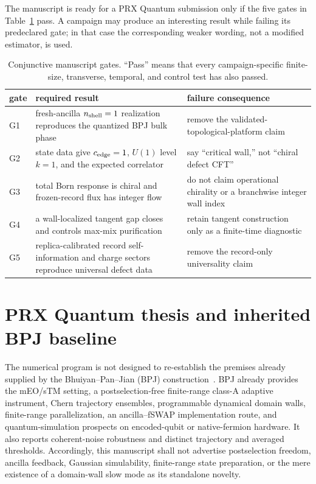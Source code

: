 \documentclass[aps,prx,onecolumn,nofootinbib,superscriptaddress,longbibliography]{revtex4-2}
\begin{document}
The manuscript is ready for a PRX Quantum submission only if the five gates in
Table~\ref{tab:gates} pass.  A campaign may produce an interesting result while failing its
predeclared gate; in that case the corresponding weaker wording, not a modified estimator,
is used.

\begin{table}[t]
\caption{Conjunctive manuscript gates.  ``Pass'' means that every campaign-specific
finite-size, transverse, temporal, and control test has also passed.}
\label{tab:gates}
\begin{ruledtabular}
\begin{tabular}{@{}p{}p{}p{}@{}}
gate & required result & failure consequence \\
\hline
G1 & fresh-ancilla $n_{\rm shell}=1$ realization reproduces the quantized BPJ bulk phase
& remove the validated-topological-platform claim \\
G2 & state data give $c_{\rm edge}=1$, $U(1)$ level $k=1$, and the expected correlator
& say ``critical wall,'' not ``chiral defect CFT'' \\
G3 & total Born response is chiral and frozen-record flux has integer flow
& do not claim operational chirality or a branchwise integer wall index \\
G4 & a wall-localized tangent gap closes and controls max-mix purification
& retain tangent construction only as a finite-time diagnostic \\
G5 & replica-calibrated record self-information and charge sectors reproduce universal defect data
& remove the record-only universality claim \\
\end{tabular}
\end{ruledtabular}
\end{table}

\section{PRX Quantum thesis and inherited BPJ baseline}

The numerical program is not designed to re-establish the premises already supplied by
the Bhuiyan--Pan--Jian (BPJ) construction~\cite{BhuiyanPanJian2026}.  BPJ already provides the mEO/sTM setting, a
postselection-free finite-range class-A adaptive instrument, Chern trajectory ensembles,
programmable dynamical domain walls, finite-range parallelization, an ancilla--fSWAP
implementation route, and quantum-simulation prospects on encoded-qubit or native-fermion
hardware.  It also reports coherent-noise robustness and distinct trajectory and averaged
thresholds.  Accordingly, this manuscript shall not advertise postselection freedom,
ancilla feedback, Gaussian simulability, finite-range state preparation, or the mere
existence of a domain-wall slow mode as its standalone novelty.
\end{document}
